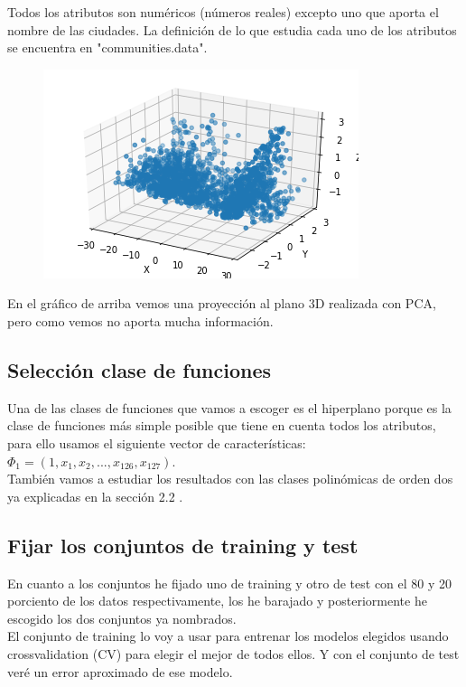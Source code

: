 \documentclass[a4paper,11pt]{article}
\begin{document}
Todos los atributos son numéricos (números reales) excepto uno que aporta el nombre de las ciudades. La definición de lo que estudia cada uno de los atributos se encuentra en "communities.data".

\begin{figure}[h]
\includegraphics[scale=0.6]{datoscom}
\centering
\end{figure}

En el gráfico de arriba vemos una proyección al plano 3D realizada con PCA, pero como vemos no aporta mucha información.

\subsection{Selección clase de funciones}

Una de las clases de funciones que vamos a escoger es el hiperplano porque es la clase de funciones más simple posible que tiene en cuenta todos los atributos, para ello usamos el siguiente vector de características: $\Phi_1=(1,x_1,x_2,...,x_{126},x_{127})$.\\

También vamos a estudiar los resultados con las clases polinómicas de orden dos ya explicadas en la sección 2.2 .

\subsection{Fijar los conjuntos de training y test}

En cuanto a los conjuntos he fijado uno de training y otro de test con el 80 y 20 porciento de los datos respectivamente, los he barajado y posteriormente he escogido los dos conjuntos ya nombrados.\\

El conjunto de training lo voy a usar para entrenar los modelos elegidos usando crossvalidation (CV) para elegir el mejor de todos ellos. Y con el conjunto de test veré un error aproximado de ese modelo.
\end{document}
